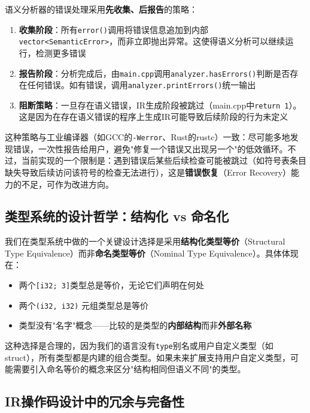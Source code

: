\documentclass[12pt,a4paper]{ctexart}
\begin{document}
语义分析器的错误处理采用\textbf{先收集、后报告}的策略：

\begin{enumerate}
    \item \textbf{收集阶段}：所有\texttt{error()}调用将错误信息追加到内部\texttt{vector<SemanticError>}，而非立即抛出异常。这使得语义分析可以继续运行，检测更多错误
    \item \textbf{报告阶段}：分析完成后，由\texttt{main.cpp}调用\texttt{analyzer.hasErrors()}判断是否存在任何错误。如有错误，调用\texttt{analyzer.printErrors()}统一输出
    \item \textbf{阻断策略}：一旦存在语义错误，IR生成阶段被跳过（main.cpp中\texttt{return 1}）。这是因为在存在语义错误的程序上生成IR可能导致后续阶段的行为未定义
\end{enumerate}

这种策略与工业编译器（如GCC的\texttt{-Werror}、Rust的rustc）一致：尽可能多地发现错误，一次性报告给用户，避免"修复一个错误又出现另一个"的低效循环。不过，当前实现的一个限制是：遇到错误后某些后续检查可能被跳过（如符号表条目缺失导致后续访问该符号的检查无法进行），这是\textbf{错误恢复}（Error Recovery）能力的不足，可作为改进方向。

\subsection{类型系统的设计哲学：结构化 vs 命名化}

我们在类型系统中做的一个关键设计选择是采用\textbf{结构化类型等价}（Structural Type Equivalence）而非\textbf{命名类型等价}（Nominal Type Equivalence）。具体体现在：

\begin{itemize}
    \item 两个\texttt{[i32; 3]}类型总是等价，无论它们声明在何处
    \item 两个\texttt{(i32, i32)} 元组类型总是等价
    \item 类型没有"名字"概念——比较的是类型的\textbf{内部结构}而非\textbf{外部名称}
\end{itemize}

这种选择是合理的，因为我们的语言没有\texttt{type}别名或用户自定义类型（如struct），所有类型都是内建的组合类型。如果未来扩展支持用户自定义类型，可能需要引入命名等价的概念来区分"结构相同但语义不同"的类型。

\subsection{IR操作码设计中的冗余与完备性}
\end{document}
